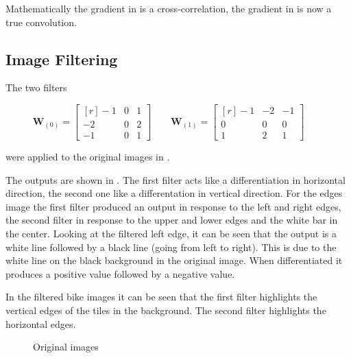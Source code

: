 \documentclass[12pt,a4paper]{scrartcl}
\newcommand{\matr}[1]{\mathbf{#1}}
\begin{document}
	Mathematically the gradient in  is a cross-correlation, the gradient in  is now a true convolution.

	\subsection*{Image Filtering}
	
	The two filters 
	
	\begin{equation}
		\matr{W}_{(0)} = \begin{bmatrix*}[r]
			-1 & 0 & 1 \\ -2 & 0 & 2 \\ -1 & 0 & 1
		\end{bmatrix*} \qquad
		\matr{W}_{(1)} = \begin{bmatrix*}[r]
		-1 & -2 & -1 \\ 0 & 0 & 0 \\ 1 & 2 & 1
	\end{bmatrix*} \qquad
	\end{equation}
	
	were applied to the original images in .
	
	The outputs are shown in .
	The first filter acts like a differentiation in horizontal direction, the second one like a differentation in vertical direction.
	For the edges image the first filter produced an output in response to the left and right edges, the second filter in response to the upper and lower edges and the white bar in the center.
	Looking at the filtered left edge, it can be seen that the output is a white line followed by a black line (going from left to right).  This is due to the white line on the black background in the original image. When differentiated it produces a positive value followed by a negative value.
	
	In the filtered bike images it can be seen that the first filter highlights the vertical edges of the tiles in the background. The second filter highlights the horizontal edges.
	
	\begin{figure}[H]
		\centering	
		\caption{Original images}
		\label{fig:ex4_1_img_orig}
	\end{figure}
\end{document}
